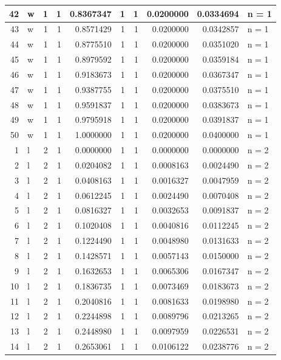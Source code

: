 \documentclass[
  letterpaper,
  DIV=11,
  numbers=noendperiod]{scrreprt}
\begin{document}
\begin{table}
\begin{tabular}[t]{r|l|r|r|r|r|r|r|r|l}
\hline
42 & w & 1 & 1 & 0.8367347 & 1 & 1 & 0.0200000 & 0.0334694 & n = 1\\
\hline
43 & w & 1 & 1 & 0.8571429 & 1 & 1 & 0.0200000 & 0.0342857 & n = 1\\
\hline
44 & w & 1 & 1 & 0.8775510 & 1 & 1 & 0.0200000 & 0.0351020 & n = 1\\
\hline
45 & w & 1 & 1 & 0.8979592 & 1 & 1 & 0.0200000 & 0.0359184 & n = 1\\
\hline
46 & w & 1 & 1 & 0.9183673 & 1 & 1 & 0.0200000 & 0.0367347 & n = 1\\
\hline
47 & w & 1 & 1 & 0.9387755 & 1 & 1 & 0.0200000 & 0.0375510 & n = 1\\
\hline
48 & w & 1 & 1 & 0.9591837 & 1 & 1 & 0.0200000 & 0.0383673 & n = 1\\
\hline
49 & w & 1 & 1 & 0.9795918 & 1 & 1 & 0.0200000 & 0.0391837 & n = 1\\
\hline
50 & w & 1 & 1 & 1.0000000 & 1 & 1 & 0.0200000 & 0.0400000 & n = 1\\
\hline
1 & l & 2 & 1 & 0.0000000 & 1 & 1 & 0.0000000 & 0.0000000 & n = 2\\
\hline
2 & l & 2 & 1 & 0.0204082 & 1 & 1 & 0.0008163 & 0.0024490 & n = 2\\
\hline
3 & l & 2 & 1 & 0.0408163 & 1 & 1 & 0.0016327 & 0.0047959 & n = 2\\
\hline
4 & l & 2 & 1 & 0.0612245 & 1 & 1 & 0.0024490 & 0.0070408 & n = 2\\
\hline
5 & l & 2 & 1 & 0.0816327 & 1 & 1 & 0.0032653 & 0.0091837 & n = 2\\
\hline
6 & l & 2 & 1 & 0.1020408 & 1 & 1 & 0.0040816 & 0.0112245 & n = 2\\
\hline
7 & l & 2 & 1 & 0.1224490 & 1 & 1 & 0.0048980 & 0.0131633 & n = 2\\
\hline
8 & l & 2 & 1 & 0.1428571 & 1 & 1 & 0.0057143 & 0.0150000 & n = 2\\
\hline
9 & l & 2 & 1 & 0.1632653 & 1 & 1 & 0.0065306 & 0.0167347 & n = 2\\
\hline
10 & l & 2 & 1 & 0.1836735 & 1 & 1 & 0.0073469 & 0.0183673 & n = 2\\
\hline
11 & l & 2 & 1 & 0.2040816 & 1 & 1 & 0.0081633 & 0.0198980 & n = 2\\
\hline
12 & l & 2 & 1 & 0.2244898 & 1 & 1 & 0.0089796 & 0.0213265 & n = 2\\
\hline
13 & l & 2 & 1 & 0.2448980 & 1 & 1 & 0.0097959 & 0.0226531 & n = 2\\
\hline
14 & l & 2 & 1 & 0.2653061 & 1 & 1 & 0.0106122 & 0.0238776 & n = 2\\

\end{tabular}
\end{table}
\end{document}
